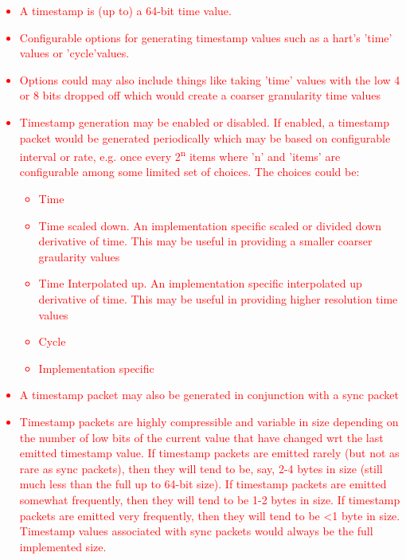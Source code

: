 \textcolor{red}{\begin{itemize}
\item
A timestamp is (up to) a 64-bit time value. 
\item
Configurable options for generating timestamp values such as a hart's 'time' values or 'cycle'values. 
\item
Options could may also include things like taking 'time' values with the low 4 or 8 bits dropped off which would create a coarser granularity time values
\item
Timestamp generation may be enabled or disabled.  If enabled, a
timestamp packet would be generated periodically which may be based on 
configurable interval or rate, e.g. once every 2\textsuperscript{n} items where
'n' and 'items' are configurable among some limited set of
choices. The choices could be:
\begin{itemize}
\item
Time
\item
Time scaled down. An implementation specific scaled or divided down derivative of time. This may be useful in providing a smaller coarser graularity values
\item
Time Interpolated up. An implementation specific interpolated up derivative of time. This may be useful in providing higher resolution time values
\item
Cycle
\item
Implementation specific
\end{itemize}
\item
A timestamp packet may also be generated in conjunction
with a sync packet 
\item
Timestamp packets are highly compressible and variable in size
depending on the number of low bits of the current value that have
changed wrt the last emitted timestamp value.  If timestamp packets
are emitted rarely (but not as rare as sync packets), then they will
tend to be, say, 2-4 bytes in size (still much less than the full up
to 64-bit size).  If timestamp packets are emitted somewhat
frequently, then they will tend to be 1-2 bytes in size.  If timestamp
packets are emitted very frequently, then they will tend to be <1 byte
in size.  Timestamp values associated with sync packets would always
be the full implemented size.
\end{itemize}
}
